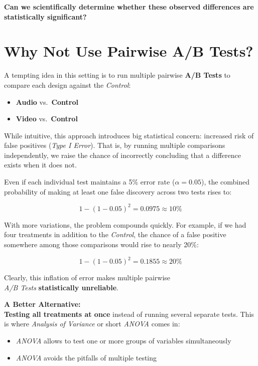 \documentclass[
  letterpaper,
  DIV=11,
  numbers=noendperiod]{scrartcl}
\begin{document}
\textbf{Can we scientifically determine whether these observed
differences are statistically significant?}

\section{Why Not Use Pairwise A/B
Tests?}\label{why-not-use-pairwise-ab-tests}

A tempting idea in this setting is to run multiple pairwise \textbf{A/B
Tests} to compare each design against the \emph{Control}:

\begin{itemize}
\item
  \textbf{Audio} vs.~\textbf{Control}
\item
  \textbf{Video} vs.~\textbf{Control}
\end{itemize}

While intuitive, this approach introduces big statistical concern:
increased risk of false positives (\emph{Type I Error}). That is, by
running multiple comparisons independently, we raise the chance of
incorrectly concluding that a difference exists when it does not.

Even if each individual test maintains a 5\% error rate
(\(\alpha = 0.05\)), the combined probability of making at least one
false discovery across two tests rises to:

\[1−(1−0.05)^2=0.0975\approx 10
\%\]

With more variations, the problem compounds quickly. For example, if we
had four treatments in addition to the \emph{Control}, the chance of a
false positive somewhere among those comparisons would rise to nearly
20\%:

\[1−(1−0.05)^2=0.1855\approx 20 \%\]

Clearly, this inflation of error makes multiple pairwise\\
\emph{A/B Tests} \textbf{statistically unreliable}.

\textbf{A Better Alternative:\\
Testing all treatments at once} instead of running several separate
tests. This is where \emph{Analysis of Variance} or short \emph{ANOVA}
comes in:

\begin{itemize}
\item
  \emph{ANOVA} allows to test one or more groups of variables
  simultaneously
\item
  \emph{ANOVA} avoids the pitfalls of multiple testing
\end{itemize}
\end{document}
